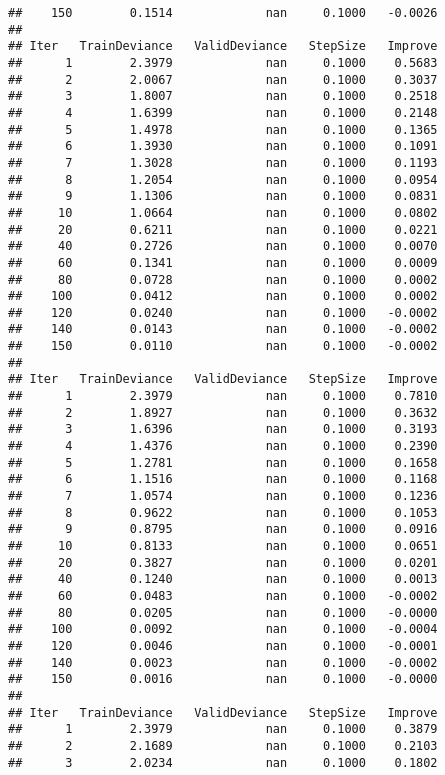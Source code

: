 \documentclass[]{article}
\begin{document}
\begin{verbatim}
##    150        0.1514             nan     0.1000   -0.0026
## 
## Iter   TrainDeviance   ValidDeviance   StepSize   Improve
##      1        2.3979             nan     0.1000    0.5683
##      2        2.0067             nan     0.1000    0.3037
##      3        1.8007             nan     0.1000    0.2518
##      4        1.6399             nan     0.1000    0.2148
##      5        1.4978             nan     0.1000    0.1365
##      6        1.3930             nan     0.1000    0.1091
##      7        1.3028             nan     0.1000    0.1193
##      8        1.2054             nan     0.1000    0.0954
##      9        1.1306             nan     0.1000    0.0831
##     10        1.0664             nan     0.1000    0.0802
##     20        0.6211             nan     0.1000    0.0221
##     40        0.2726             nan     0.1000    0.0070
##     60        0.1341             nan     0.1000    0.0009
##     80        0.0728             nan     0.1000    0.0002
##    100        0.0412             nan     0.1000    0.0002
##    120        0.0240             nan     0.1000   -0.0002
##    140        0.0143             nan     0.1000   -0.0002
##    150        0.0110             nan     0.1000   -0.0002
## 
## Iter   TrainDeviance   ValidDeviance   StepSize   Improve
##      1        2.3979             nan     0.1000    0.7810
##      2        1.8927             nan     0.1000    0.3632
##      3        1.6396             nan     0.1000    0.3193
##      4        1.4376             nan     0.1000    0.2390
##      5        1.2781             nan     0.1000    0.1658
##      6        1.1516             nan     0.1000    0.1168
##      7        1.0574             nan     0.1000    0.1236
##      8        0.9622             nan     0.1000    0.1053
##      9        0.8795             nan     0.1000    0.0916
##     10        0.8133             nan     0.1000    0.0651
##     20        0.3827             nan     0.1000    0.0201
##     40        0.1240             nan     0.1000    0.0013
##     60        0.0483             nan     0.1000   -0.0002
##     80        0.0205             nan     0.1000   -0.0000
##    100        0.0092             nan     0.1000   -0.0004
##    120        0.0046             nan     0.1000   -0.0001
##    140        0.0023             nan     0.1000   -0.0002
##    150        0.0016             nan     0.1000   -0.0000
## 
## Iter   TrainDeviance   ValidDeviance   StepSize   Improve
##      1        2.3979             nan     0.1000    0.3879
##      2        2.1689             nan     0.1000    0.2103
##      3        2.0234             nan     0.1000    0.1802

\end{verbatim}
\end{document}
